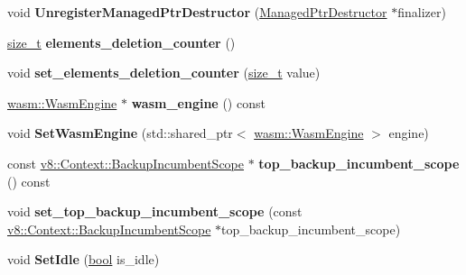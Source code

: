 \begin{DoxyCompactItemize}
void {\bfseries Unregister\+Managed\+Ptr\+Destructor} (\mbox{\hyperlink{structv8_1_1internal_1_1ManagedPtrDestructor}{Managed\+Ptr\+Destructor}} $\ast$finalizer)
\item 
\mbox{\label{classv8_1_1internal_1_1Isolate_a37b82464c73d72b17a473774f601ef67}} 
\mbox{\hyperlink{classsize__t}{size\+\_\+t}} {\bfseries elements\+\_\+deletion\+\_\+counter} ()
\item 
\mbox{\label{classv8_1_1internal_1_1Isolate_acee892e6ea16075cce2581752e139e2c}} 
void {\bfseries set\+\_\+elements\+\_\+deletion\+\_\+counter} (\mbox{\hyperlink{classsize__t}{size\+\_\+t}} value)
\item 
\mbox{\label{classv8_1_1internal_1_1Isolate_a97203e2d2bf2393b1f863af1f2ffd5af}} 
\mbox{\hyperlink{classv8_1_1internal_1_1wasm_1_1WasmEngine}{wasm\+::\+Wasm\+Engine}} $\ast$ {\bfseries wasm\+\_\+engine} () const
\item 
\mbox{\label{classv8_1_1internal_1_1Isolate_a6f43e05fc3348551dad34f3144f88d08}} 
void {\bfseries Set\+Wasm\+Engine} (std\+::shared\+\_\+ptr$<$ \mbox{\hyperlink{classv8_1_1internal_1_1wasm_1_1WasmEngine}{wasm\+::\+Wasm\+Engine}} $>$ engine)
\item 
\mbox{\label{classv8_1_1internal_1_1Isolate_a282c0646eb2497b1c6dd051338d2321e}} 
const \mbox{\hyperlink{classv8_1_1Context_1_1BackupIncumbentScope}{v8\+::\+Context\+::\+Backup\+Incumbent\+Scope}} $\ast$ {\bfseries top\+\_\+backup\+\_\+incumbent\+\_\+scope} () const
\item 
\mbox{\label{classv8_1_1internal_1_1Isolate_abb5eb0aefae00575b759170335f3afba}} 
void {\bfseries set\+\_\+top\+\_\+backup\+\_\+incumbent\+\_\+scope} (const \mbox{\hyperlink{classv8_1_1Context_1_1BackupIncumbentScope}{v8\+::\+Context\+::\+Backup\+Incumbent\+Scope}} $\ast$top\+\_\+backup\+\_\+incumbent\+\_\+scope)
\item 
\mbox{\label{classv8_1_1internal_1_1Isolate_a90143170825ef67b7d8472a252f06934}} 
void {\bfseries Set\+Idle} (\mbox{\hyperlink{classbool}{bool}} is\+\_\+idle)
\end{DoxyCompactItemize}
